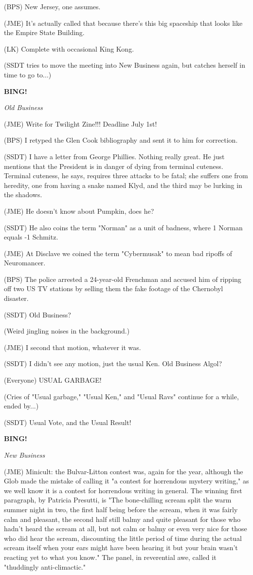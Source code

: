 \documentclass[12pt]{article}
\newcommand{\bing}{{\bf BING!} }
\newcommand{\goto}[1]{\bing \vskip 12pt \centerline{{\em{#1}}}}
\begin{document}
(BPS) New Jersey, one assumes.

(JME) It's actually called that because there's this big spaceship that looks like the Empire State Building.

(LK) Complete with occasional King Kong.

(SSDT tries to move the meeting into New Business again, but catches herself in time to go to...)

\goto{Old Business}

(JME) Write for Twilight Zine!!! Deadline July 1st!

(BPS) I retyped the Glen Cook bibliography and sent it to him for correction.

(SSDT) I have a letter from George Phillies. Nothing really great. He just mentions that the President is in danger of dying from terminal cuteness. Terminal cuteness, he says, requires three attacks to be fatal; she suffers one from heredity, one from having a snake named Klyd, and the third may be lurking in the shadows.

(JME) He doesn't know about Pumpkin, does he?

(SSDT) He also coins the term "Norman" as a unit of badness, where 1 Norman equals -1 Schmitz.

(JME) At Disclave we coined the term "Cybermusak" to mean bad ripoffs of Neuromancer.

(BPS) The police arrested a 24-year-old Frenchman and accused him of ripping off two US TV stations by selling them the fake footage of the Chernobyl disaster.

(SSDT) Old Business?

(Weird jingling noises in the background.)

(JME) I second that motion, whatever it was.

(SSDT) I didn't see any motion, just the usual Ken. Old Business Algol?

(Everyone) USUAL GARBAGE!

(Cries of "Usual garbage," "Usual Ken," and "Usual Ravs" continue for a while, ended by...)

(SSDT) Usual Vote, and the Usual Result!

\goto{New Business}

(JME) Minicult: the Bulvar-Litton contest was, again for the year, although the Glob made the mistake of calling it "a contest for horrendous mystery writing," as we well know it is a contest for horrendous writing in general. The winning first paragraph, by Patricia Presutti, is "The bone-chilling scream split the warm summer night in two, the first half being before the scream, when it was fairly calm and pleasant, the second half still balmy and quite pleasant for those who hadn't heard the scream at all, but not calm or balmy or even very nice for those who did hear the scream, discounting the little period of time during the actual scream itself when your ears might have been hearing it but your brain wasn't reacting yet to what you know." The panel, in reverential awe, called it "thuddingly anti-climactic."
\end{document}
